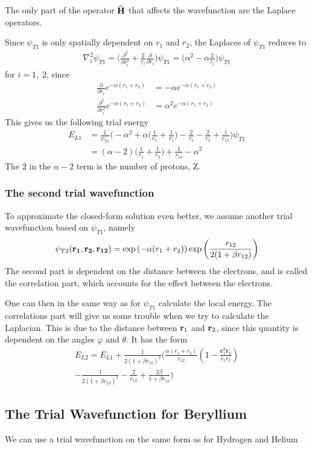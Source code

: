 \documentclass[twocolumn]{article}[10pt]
\newcommand{\eq}[1]{\begin{align*}#1\end{align*}}
\renewcommand\vec[1]{{\bf #1}}
\newcommand{\OP}[1]{{\bf\widehat{#1}}}
\begin{document}
The only part of the operator $\OP H$ that affects the wavefunction
are the Laplace operators.

Since $\psi_{T1}$ is only spatially dependent on $r_1$ and $r_2$,
the Laplaces of $\psi_{T1}$ reduces to
{\small
\eq{
  \nabla_i^2 \psi_{T1} = \bigg( \frac{\partial^2}{\partial r_i^2} 
    + \frac{2}{r_i} \frac{\partial}{\partial r_i} \bigg) \psi_{T1}
    = \bigg( \alpha^2 -\alpha\frac{2}{r_i}  \bigg)\psi_{T1}
}}%
for $i = 1,\;2$, since
{\small
\eq{
  \frac{\partial}{\partial r_i} e^{-\alpha (r_1+r_2)}
    &= -\alpha e^{-\alpha (r_1+r_2)}\\
\frac{\partial^2}{\partial r_i^2} e^{-\alpha (r_1+r_2)}
    &= \alpha^2 e^{-\alpha (r_1+r_2)}
}}%
This gives us the following trial energy
{\small
\eq{
  E_{L1}&=\frac{1}{\psi_{T1}}\bigg( -\alpha^2 
  +\alpha\bigg( \frac{1}{r_1}+\frac{1}{r_1}  \bigg)
    -\frac{2}{r_1}-\frac{2}{r_2} + \frac{1}{r_{12}}
    \bigg)\psi_{T1}\\
  &=(\alpha-2)\bigg( \frac{1}{r_1}+\frac{1}{r_2} \bigg)
    +\frac{1}{r_{12}}-\alpha^2
}}%
The $2$ in the $\alpha-2$ term is the number of protons, Z.

\subsubsection{The second trial wavefunction}
To approximate the closed-form solution even better,
we assume another trial wavefunction based on $\psi_{T1}$, namely
{\small
\eq{
  \psi_{T2} ({\bf r_1},{\bf r_2}, {\bf r_{12}})
    =\exp{\left(-\alpha(r_1+r_2)\right)}
    \exp{\left(\frac{r_{12}}{2(1+\beta r_{12})}\right)}
}}%
The second part is dependent on the distance between the
electrons, and is called the correlation part,
which accounts for the effect between the electrons.

One can then in the same way as for $\psi_{T1}$ calculate
the local energy. The correlations part will give us some trouble
when we try to calculate the Laplacian. This is due to
the distance between $\vec r_1$ and $\vec r_2$, since this quantity
is dependent on the angles $\varphi$ and $\theta$.
It has the form
{\small
\eq{
	E_{L2} = E_{L1}+\frac{1}{2(1+\beta r_{12})^2}
	\bigg(\frac{\alpha(r_1+r_2)}{r_{12}}(1-
	\frac{\mathbf{r}_1^T\mathbf{r}_2}{r_1r_2})\\
	-\frac{1}{2(1+\beta r_{12})^2}-\frac{2}{r_{12}}+
	\frac{2\beta}{1+\beta r_{12}}\bigg)
}}%

\subsection{The Trial Wavefunction for Beryllium}
We can use a trial wavefunction on the same form as for
Hydrogen and Helium
\end{document}
